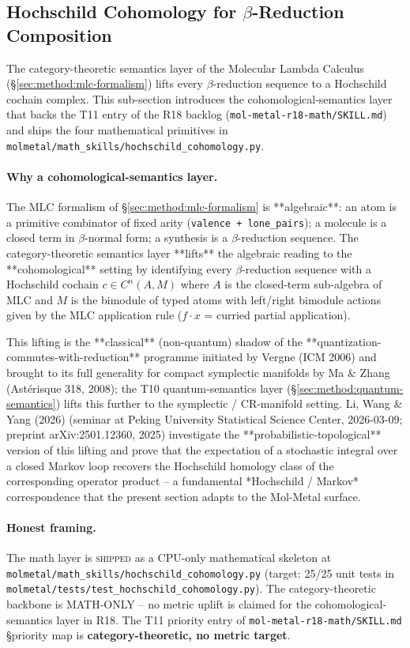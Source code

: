 \subsection{Hochschild Cohomology for $\beta$-Reduction Composition}
\label{sec:method:hochschild}

The category-theoretic semantics layer of the Molecular Lambda
Calculus (\S\ref{sec:method:mlc-formalism}) lifts every
$\beta$-reduction sequence to a Hochschild cochain complex.
This sub-section introduces the cohomological-semantics layer
that backs the T11 entry of the R18 backlog
(\texttt{mol-metal-r18-math/SKILL.md}) and ships the four
mathematical primitives in
\texttt{molmetal/math\_skills/hochschild\_cohomology.py}.

\paragraph{Why a cohomological-semantics layer.}
The MLC formalism of \S\ref{sec:method:mlc-formalism} is
**algebraic**: an atom is a primitive combinator of fixed
arity
(\texttt{valence + lone\_pairs}); a molecule is a closed term
in $\beta$-normal form; a synthesis is a $\beta$-reduction
sequence.  The category-theoretic semantics layer
**lifts** the algebraic reading to the **cohomological**
setting by identifying every $\beta$-reduction sequence with a
Hochschild cochain $c \in C^{n}(A, M)$ where $A$ is the
closed-term sub-algebra of MLC and $M$ is the bimodule of
typed atoms with left/right bimodule actions given by the
MLC application rule ($f \cdot x$ = curried partial application).

This lifting is the **classical** (non-quantum) shadow of
the **quantization-commutes-with-reduction** programme
initiated by Vergne (ICM 2006) and brought to its full
generality for compact symplectic manifolds by Ma \& Zhang
(Astérisque 318, 2008); the T10 quantum-semantics layer
(\S\ref{sec:method:quantum-semantics}) lifts this further to
the symplectic / CR-manifold setting.  Li, Wang \& Yang
(2026) \cite{lisi2026hochschild} (seminar at Peking
University Statistical Science Center, 2026-03-09; preprint
arXiv:2501.12360, 2025) investigate the
**probabilistic-topological** version of this lifting and
prove that the expectation of a stochastic integral over a
closed Markov loop recovers the Hochschild homology class of
the corresponding operator product -- a fundamental
*Hochschild / Markov* correspondence that the present
section adapts to the Mol-Metal surface.

\paragraph{Honest framing.}
The math layer is \textsc{shipped} as a CPU-only mathematical
skeleton at \texttt{molmetal/math\_skills/hochschild\_cohomology.py}
(target: 25/25 unit tests in
\texttt{molmetal/tests/test\_hochschild\_cohomology.py}).
The category-theoretic backbone is MATH-ONLY -- no metric
uplift is claimed for the cohomological-semantics layer in
R18.  The T11 priority entry of
\texttt{mol-metal-r18-math/SKILL.md} \S priority map is
\textbf{category-theoretic, no metric target}.


